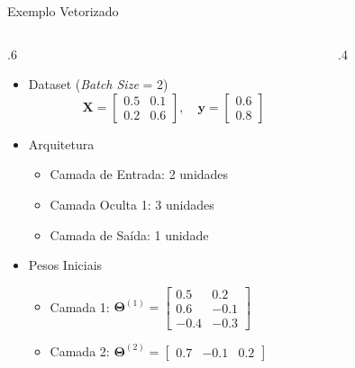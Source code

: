 \documentclass[aspectratio=169, xcolor=dvipsnames]{beamer}
\begin{document}
  \begin{frame}{Exemplo Vetorizado}
    \begin{columns}
        \begin{column}{.6\textwidth}

        \begin{itemize}
            \item Dataset (\textit{Batch Size} = 2)
            \[
              \mathbf{X} =
              \begin{bmatrix}
                0.5 & 0.1 \\
                0.2 & 0.6
              \end{bmatrix}, \quad \mathbf{y} =
              \begin{bmatrix}
                0.6 \\
                0.8
              \end{bmatrix}
            \]
            \item Arquitetura
                \begin{itemize}
                  \item Camada de Entrada: 2 unidades
                  \item Camada Oculta 1: 3 unidades
                  \item Camada de Saída: 1 unidade
                \end{itemize}
            \item Pesos Iniciais
                \begin{itemize}
                  \item Camada 1: $\mathbf{\Theta}^{(1)}=
                    \begin{bmatrix}
                      0.5  & 0.2  \\
                      0.6  & -0.1 \\
                      -0.4 & -0.3
                    \end{bmatrix}$
            
                  \item Camada 2: $\mathbf{\Theta}^{(2)}=
                    \begin{bmatrix}
                      0.7 & -0.1 & 0.2
                    \end{bmatrix}$
                \end{itemize}
        \end{itemize}

        \end{column}
        \begin{column}{.4\textwidth}
            \begin{figure}
                \centering
                \resizebox{\linewidth}{!}{
                }
            \end{figure}
        \end{column}
    \end{columns}

  \end{frame}
\end{document}
